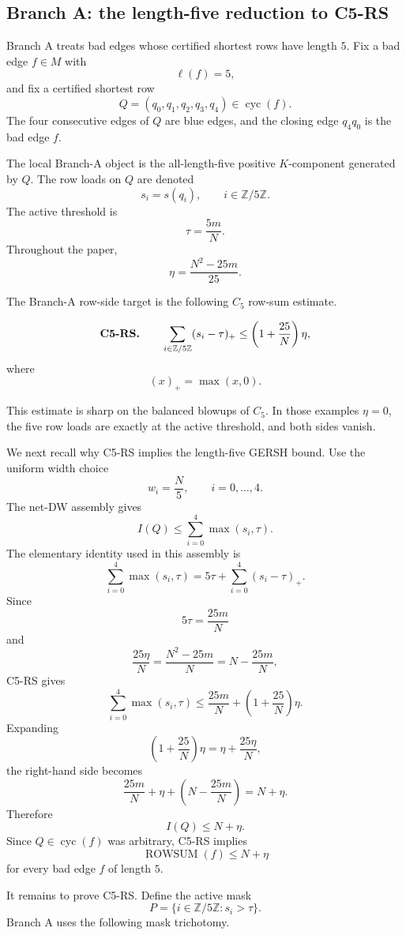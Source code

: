 
\subsection{Branch A: the length-five reduction to C5-RS}

Branch A treats bad edges whose certified shortest rows have length \(5\).  Fix a bad edge \(f \in M\) with
\[
\ell(f)=5,
\]
and fix a certified shortest row
\[
Q=(q_0,q_1,q_2,q_3,q_4)\in \operatorname{cyc}(f).
\]
The four consecutive edges of \(Q\) are blue edges, and the closing edge \(q_4q_0\) is the bad edge \(f\).

The local Branch-A object is the all-length-five positive \(K\)-component generated by \(Q\).  The row loads on \(Q\) are denoted
\[
s_i=s(q_i),\qquad i\in \mathbb Z/5\mathbb Z.
\]
The active threshold is
\[
\tau=\frac{5m}{N}.
\]
Throughout the paper,
\[
\eta=\frac{N^2-25m}{25}.
\]

The Branch-A row-side target is the following \(C_5\) row-sum estimate.

\[
\text{\bf C5-RS.}\qquad
\sum_{i\in\mathbb Z/5\mathbb Z}(s_i-\tau)_+
\le
\left(1+\frac{25}{N}\right)\eta,
\]
where
\[
(x)_+=\max(x,0).
\]

This estimate is sharp on the balanced blowups of \(C_5\).  In those examples \(\eta=0\), the five row loads are exactly at the active threshold, and both sides vanish.

We next recall why C5-RS implies the length-five GERSH bound.  Use the uniform width choice
\[
w_i=\frac N5,\qquad i=0,\ldots,4.
\]
The net-DW assembly gives
\[
I(Q)\le \sum_{i=0}^4 \max(s_i,\tau).
\]
The elementary identity used in this assembly is
\[
\sum_{i=0}^4 \max(s_i,\tau)
=
5\tau+\sum_{i=0}^4(s_i-\tau)_+.
\]
Since
\[
5\tau=\frac{25m}{N}
\]
and
\[
\frac{25\eta}{N}
=
\frac{N^2-25m}{N}
=
N-\frac{25m}{N},
\]
C5-RS gives
\[
\sum_{i=0}^4 \max(s_i,\tau)
\le
\frac{25m}{N}
+
\left(1+\frac{25}{N}\right)\eta.
\]
Expanding
\[
\left(1+\frac{25}{N}\right)\eta
=
\eta+\frac{25\eta}{N},
\]
the right-hand side becomes
\[
\frac{25m}{N}
+
\eta
+
\left(N-\frac{25m}{N}\right)
=
N+\eta.
\]
Therefore
\[
I(Q)\le N+\eta.
\]
Since \(Q\in\operatorname{cyc}(f)\) was arbitrary, C5-RS implies
\[
\operatorname{ROWSUM}(f)\le N+\eta
\]
for every bad edge \(f\) of length \(5\).

It remains to prove C5-RS.  Define the active mask
\[
P=\{i\in \mathbb Z/5\mathbb Z:s_i>\tau\}.
\]
Branch A uses the following mask trichotomy.

